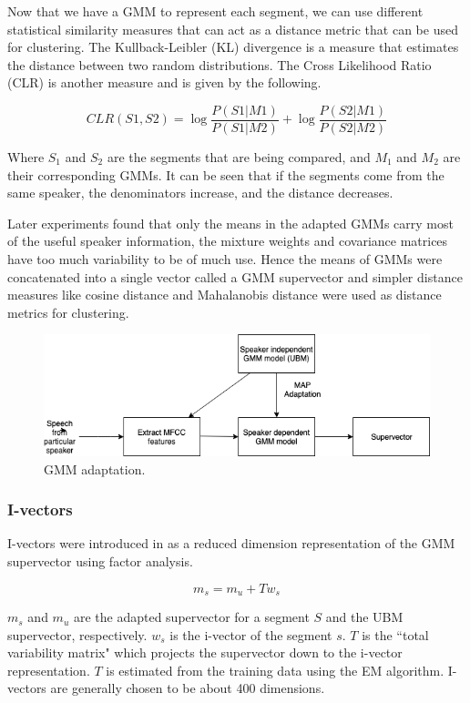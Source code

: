 		Now that we have a GMM to represent each segment, we can use different statistical similarity measures that can act as a distance metric that can be used for clustering. The Kullback-Leibler (KL) divergence \cite{kullback1997information} is a measure that estimates the distance between two random distributions. The Cross Likelihood Ratio (CLR) is another measure and is given by the following.
		
		$$ CLR(S1, S2) = \log\frac{P(S1|M1)}{P(S1|M2)} + \log\frac{P(S2|M1)}{P(S2|M2)} $$
		
		Where $S_1$ and $S_2$ are the segments that are being compared, and $M_1$ and $M_2$ are their corresponding GMMs. It can be seen that if the segments come from the same speaker, the denominators increase, and the distance decreases.
		
		Later experiments found that only the means in the adapted GMMs carry most of the useful speaker information, the mixture weights and covariance matrices have too much variability to be of much use. Hence the means of GMMs were concatenated into a single vector called a GMM supervector and simpler distance measures like cosine distance and Mahalanobis distance were used as distance metrics for clustering.
		
		\begin{figure}[h]
			\includegraphics[width=15cm]{figures/supervector.png}
			\centering
			\caption{GMM adaptation.}
			\label{fig:fig-supervector}
		\end{figure}

		\subsubsection{I-vectors}
		I-vectors were introduced in \cite{5545402} as a reduced dimension representation of the GMM supervector using factor analysis.
		
		$$ m_s = m_u + Tw_s $$
		
		$m_s$ and $m_u$ are the adapted supervector for a segment $S$ and the UBM supervector, respectively. $w_s$ is the i-vector of the segment $s$. $T$ is the ``total variability matrix" which projects the supervector down to the i-vector representation. $T$ is estimated from the training data using the EM algorithm. I-vectors are generally chosen to be about 400 dimensions.
		
